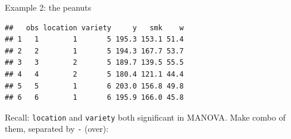 % 
%
%  
%
%  
%
%
%    
%  
%  

\begin{frame}[fragile]{Example 2: the peanuts}

\begin{knitrout}
\color{fgcolor}\begin{kframe}
\begin{alltt}
\hlkwb{=}\hlstd{(}\hlstd{,}
\end{alltt}
\begin{verbatim}
##   obs location variety     y   smk    w
## 1   1        1       5 195.3 153.1 51.4
## 2   2        1       5 194.3 167.7 53.7
## 3   3        2       5 189.7 139.5 55.5
## 4   4        2       5 180.4 121.1 44.4
## 5   5        1       6 203.0 156.8 49.8
## 6   6        1       6 195.9 166.0 45.8
\end{verbatim}
\end{kframe}
\end{knitrout}

Recall: \texttt{location} and \texttt{variety} both significant in
MANOVA. Make combo of them, separated by \texttt{-} (over):

  
\end{frame}

